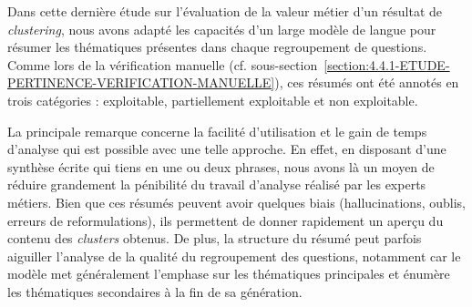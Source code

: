 			Dans cette dernière étude sur l'évaluation de la valeur métier d'un résultat de \textit{clustering}, nous avons adapté les capacités d'un large modèle de langue pour résumer les thématiques présentes dans chaque regroupement de questions.
			Comme lors de la vérification manuelle (cf. sous-section~\ref{section:4.4.1-ETUDE-PERTINENCE-VERIFICATION-MANUELLE}), ces résumés ont été annotés en trois catégories : exploitable, partiellement exploitable et non exploitable.
		
			La principale remarque concerne la facilité d'utilisation et le gain de temps d'analyse qui est possible avec une telle approche.
			En effet, en disposant d'une synthèse écrite qui tiens en une ou deux phrases, nous avons là un moyen de réduire grandement la pénibilité du travail d'analyse réalisé par les experts métiers.
			Bien que ces résumés peuvent avoir quelques biais (hallucinations, oublis, erreurs de reformulations), ils permettent de donner rapidement un aperçu du contenu des \textit{clusters} obtenus.
			De plus, la structure du résumé peut parfois aiguiller l'analyse de la qualité du regroupement des questions, notamment car le modèle met généralement l'emphase sur les thématiques principales et énumère les thématiques secondaires à la fin de sa génération.
			
